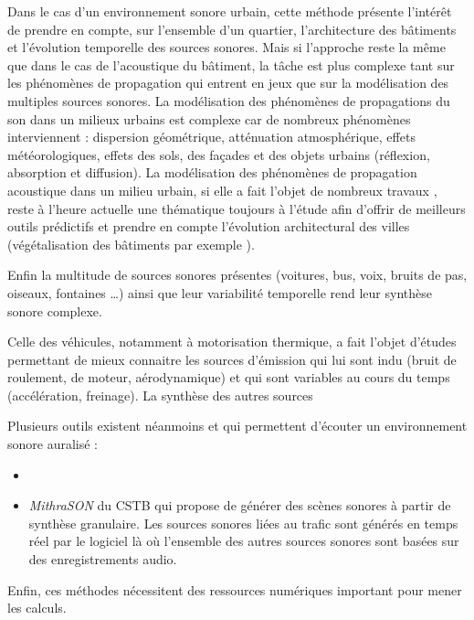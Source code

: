 Dans le cas d'un environnement sonore urbain, cette méthode présente l'intérêt de prendre en compte, sur l'ensemble d'un quartier, l'architecture des bâtiments et l'évolution temporelle des sources sonores. Mais si l'approche reste la même que dans le cas de l'acoustique du bâtiment, la tâche est plus complexe tant sur les phénomènes de propagation qui entrent en jeux que sur la modélisation des multiples sources sonores. La modélisation des phénomènes de propagations du son dans un milieux urbains est complexe car de nombreux phénomènes interviennent : dispersion géométrique, atténuation atmosphérique, effets météorologiques, effets des sols, des façades et des objets urbains (réflexion, absorption et diffusion). La modélisation des phénomènes de propagation acoustique dans un milieu urbain, si elle a fait l'objet de nombreux travaux \cite{embleton1976outdoor} \cite{embleton1996tutorial} \cite{lihoreau2006outdoor}, reste à l'heure actuelle une thématique toujours à l'étude afin d'offrir de meilleurs outils prédictifs \cite{leroy_uncertainty_2010}  \cite{guillaume_numerical_2015} et prendre en compte l'évolution architectural des villes (végétalisation des bâtiments par exemple \cite{guillaume:hal-01061125}). 

Enfin la multitude de sources sonores présentes (voitures, bus, voix, bruits de pas, oiseaux, fontaines \dots) ainsi que leur variabilité temporelle rend leur synthèse sonore complexe.

Celle des véhicules, notamment à motorisation thermique, a fait l'objet d'études permettant de mieux connaitre les sources d'émission qui lui sont indu (bruit de roulement, de moteur, aérodynamique) et qui sont variables au cours du temps (accélération, freinage). La synthèse des autres sources 


Plusieurs outils existent néanmoins et qui permettent d'écouter un environnement sonore auralisé : 

\begin{itemize}
\item
\item \textit{MithraSON} du CSTB qui propose de générer des scènes sonores à partir de synthèse granulaire. Les sources sonores liées au trafic sont générés en temps réel par le logiciel là où l'ensemble des autres sources sonores sont basées sur des enregistrements audio. 
\end{itemize}


Enfin, ces méthodes nécessitent des ressources numériques important pour mener les calculs. 

